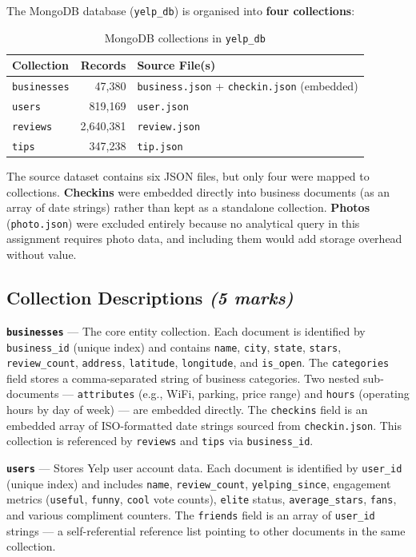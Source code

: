 \documentclass[12pt,a4paper]{article}
\newcommand{\code}[1]{\texttt{#1}}
\newcommand{\marks}[1]{\hfill\textit{(#1 marks)}}
\begin{document}
The MongoDB database (\code{yelp\_db}) is organised into \textbf{four
collections}:

\begin{table}[H]
  \centering
  \begin{tabular}{lrl}
    \toprule
    \textbf{Collection} & \textbf{Records} & \textbf{Source File(s)} \\
    \midrule
    \code{businesses} & 47,380   & \code{business.json} + \code{checkin.json} (embedded) \\
    \code{users}      & 819,169  & \code{user.json} \\
    \code{reviews}    & 2,640,381 & \code{review.json} \\
    \code{tips}       & 347,238  & \code{tip.json} \\
    \bottomrule
  \end{tabular}
  \caption{MongoDB collections in \code{yelp\_db}}
\end{table}

The source dataset contains six JSON files, but only four were mapped to
collections. \textbf{Checkins} were embedded directly into business documents
(as an array of date strings) rather than kept as a standalone collection.
\textbf{Photos} (\code{photo.json}) were excluded entirely because no
analytical query in this assignment requires photo data, and including them
would add storage overhead without value.

\subsection{Collection Descriptions \marks{5}}

\textbf{\code{businesses}} --- The core entity collection. Each document is
identified by \code{business\_id} (unique index) and contains \code{name},
\code{city}, \code{state}, \code{stars}, \code{review\_count},
\code{address}, \code{latitude}, \code{longitude}, and \code{is\_open}.
The \code{categories} field stores a comma-separated string of business
categories. Two nested sub-documents --- \code{attributes} (e.g., WiFi,
parking, price range) and \code{hours} (operating hours by day of week) ---
are embedded directly. The \code{checkins} field is an embedded array of
ISO-formatted date strings sourced from \code{checkin.json}. This collection
is referenced by \code{reviews} and \code{tips} via \code{business\_id}.

\textbf{\code{users}} --- Stores Yelp user account data. Each document is
identified by \code{user\_id} (unique index) and includes \code{name},
\code{review\_count}, \code{yelping\_since}, engagement metrics (\code{useful},
\code{funny}, \code{cool} vote counts), \code{elite} status, \code{average\_stars},
\code{fans}, and various compliment counters. The \code{friends} field is an
array of \code{user\_id} strings --- a self-referential reference list pointing
to other documents in the same collection.
\end{document}
